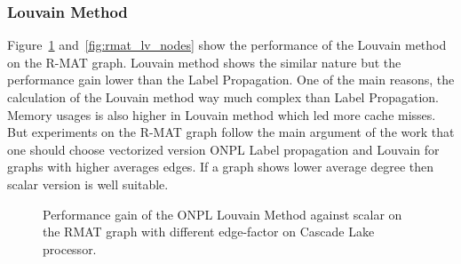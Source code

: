 \documentclass[default,iicol]{sn-jnl}%
\theoremstyle{thmstyleone}%
\theoremstyle{thmstyletwo}%
\theoremstyle{thmstylethree}%
\begin{document}
\subsubsection{Louvain Method}
Figure~\ref{fig:rmat_lv_ef} and~\ref{fig:rmat_lv_nodes} show the performance of the Louvain method on the R-MAT graph. Louvain method 
shows the similar nature but the performance gain lower than the Label Propagation. One of the main reasons, the calculation of the 
Louvain method way much complex than Label Propagation. Memory usages is also higher in Louvain method which led more cache 
misses. But experiments on the R-MAT graph follow the main argument of the work that one should choose vectorized version ONPL 
Label propagation and Louvain for graphs with higher averages edges. If a graph shows lower average degree then scalar version 
is well suitable.
\begin{figure}[hbt]
 	\centering
	\caption{Performance gain of the ONPL Louvain Method against scalar on the RMAT graph with different edge-factor on Cascade Lake processor.}
  \label{fig:rmat_lv_ef}
\end{figure}
\end{document}
